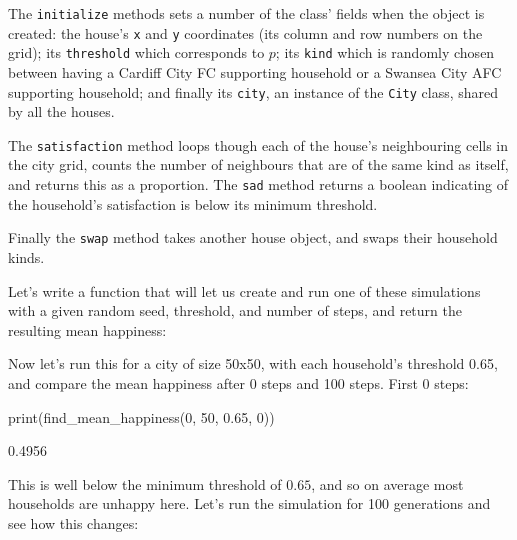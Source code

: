 The \texttt{initialize} methods sets a number of the class' fields when
the object is created: the house's \texttt{x} and \texttt{y}
coordinates (its column and row numbers on the grid); its
\texttt{threshold} which corresponds to $p$; its \texttt{kind}
which is randomly chosen between having a Cardiff City
FC supporting household or a Swansea City AFC supporting household; and finally
its \texttt{city}, an instance of the \texttt{City} class, shared
by all the houses.

The \texttt{satisfaction} method loops though each of the house's
neighbouring cells in the city grid, counts the number of neighbours that are of
the same kind as itself, and returns this as a proportion.
The \texttt{sad} method returns a boolean indicating of the
household's satisfaction is below its minimum threshold.

Finally the \texttt{swap} method takes another house object, and
swaps their household kinds.

Let's write a function that will let us create and run one of these simulations
with a given random seed, threshold, and number of steps, and return the
resulting mean happiness:



Now let's run this for a city of size 50x50, with each household's threshold
0.65, and compare the mean happiness after 0 steps and 100 steps.
First 0 steps:

\begin{Rin}
print(find_mean_happiness(0, 50, 0.65, 0))
\end{Rin}

\begin{Rout}
[1] 0.4956
\end{Rout}

This is well below the minimum threshold of $0.65$, and so on average most
households are unhappy here.
Let's run the simulation for 100 generations and see how this changes:

